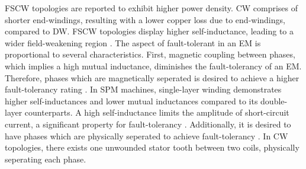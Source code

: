 \documentclass [a4 paper, 11pt, titlepage] {article}
\begin{document}
	FSCW topologies are reported to exhibit higher power density. CW comprises of shorter end-windings, resulting with a lower copper loss due to end-windings, compared to DW. FSCW topologies display higher self-inductance, leading to a wider field-weakening region \cite{farshadnia_advanced_2018}.
	The aspect of fault-tolerant in an EM is proportional to several characteristics.	First, magnetic coupling between phases, which implies a high mutual inductance, diminishes the fault-tolerancy of an EM. Therefore, phases which are magnetically seperated is desired to achieve a higher fault-tolerancy rating \cite{bianchi_use_2006}. In SPM machines, single-layer winding demonstrates higher self-inductances and lower mutual inductances compared to its double-layer counterparts. A high self-inductance limits the amplitude of short-circuit current, a significant property for fault-tolerancy \cite{el-refaie_fractional-slot_2010} \cite{ishak_comparison_2006}. Additionally, it is desired to have phases which are physically seperated to achieve fault-tolerancy \cite{bianchi_use_2006}. In CW topologies, there exists one unwounded stator tooth between two coils, physically seperating each phase.
\end{document}
